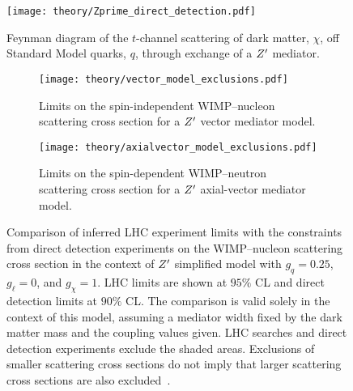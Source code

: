 \begin{figure}[htbp]
 \centering
 \texttt{[image: theory/Zprime\_direct\_detection.pdf]}
 \caption[Feynman diagram of the scattering of dark matter off Standard Model quarks through exchange of a $\Zprime$ mediator.]{%
  Feynman diagram of the $t$-channel scattering of dark matter, $\chi$, off Standard Model quarks, $q$, through exchange of a $\Zprime$ mediator.}
 \label{fig:Zprime_direct_detection}
\end{figure}

\begin{figure}[htbp]
 \centering
 \begin{subfigure}[t]{0.48\textwidth}
  \centering
  \texttt{[image: theory/vector\_model\_exclusions.pdf]}
  \caption[Limits on the spin-independent WIMP--nucleon scattering cross section for a $\Zprime$ vector mediator model.]{%
   Limits on the spin-independent WIMP--nucleon scattering cross section for a $\Zprime$ vector mediator model.}
  \label{fig:vector_model_exclusions}
 \end{subfigure}%
 \quad
 \begin{subfigure}[t]{0.48\textwidth}
  \centering
  \texttt{[image: theory/axialvector\_model\_exclusions.pdf]}
  \caption[Limits on the spin-dependent WIMP--neutron scattering cross section for a $\Zprime$ axial-vector mediator model.]{%
   Limits on the spin-dependent WIMP--neutron scattering cross section for a $\Zprime$ axial-vector mediator model.}
  \label{fig:axialvector_model_exclusions}
 \end{subfigure}%
 \caption[Comparison of inferred LHC experiment limits with the constraints from direct detection experiments on the WIMP--nucleon scattering cross section in the context of $\Zprime$ simplified model with $g_{q} = 0.25$, $g_{\ell} = 0$, and $g_{\chi} = 1$.]{%
  Comparison of inferred LHC experiment limits with the constraints from direct detection experiments on the WIMP--nucleon scattering cross section in the context of $\Zprime$ simplified model with $g_{q} = 0.25$, $g_{\ell} = 0$, and $g_{\chi} = 1$.
  LHC limits are shown at $95\%$ CL and direct detection limits at $90\%$ CL.
  The comparison is valid solely in the context of this model, assuming a mediator width fixed by the dark matter mass and the coupling values given.
  LHC searches and direct detection experiments exclude the shaded areas.
  Exclusions of smaller scattering cross sections do not imply that larger scattering cross sections are also excluded~\cite{EXOT-2017-32}.}
 \label{fig:direct_detection_exclusions}
\end{figure}


